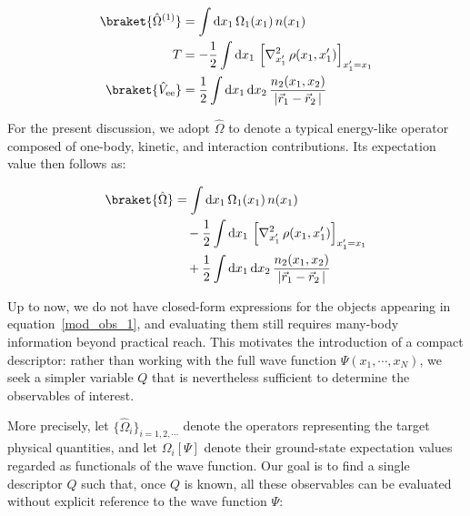 \begin{equation}
\begin{aligned}
    \braket{\hat{\Omega}^{(1)}} &= \int \mathrm{d}x_1\,\Omega_1(x_1)\,n(x_1)\\
    T &= -\frac{1}{2}\int \mathrm{d}x_1\,
    \left[\nabla_{x'_1}^{2}\,\rho(x_1,x'_1)\right]_{x'_1=x_1}\\
    \braket{\hat{V}_\mathrm{ee}} &= \frac{1}{2}\int \mathrm{d}x_1\,\mathrm{d}x_2\,
    \frac{n_2(x_1,x_2)}{|\vec{r}_1-\vec{r}_2\,|}
\end{aligned}
\label{one-body_operator_with_kernel}
\end{equation}

For the present discussion, we adopt $\hat{\Omega}$ to denote a typical energy-like operator composed of one-body, kinetic, and interaction contributions.
Its expectation value then follows as:

\begin{equation}
\begin{aligned}
    \braket{\hat{\Omega}} %
    &= \int \mathrm{d}x_1\, \Omega_1(x_1)\, n(x_1) \\
    &\quad - \frac{1}{2}\int \mathrm{d}x_1\,
    \left[\nabla_{x'_1}^{2}\,\rho(x_1,x'_1)\right]_{x'_1=x_1} \\
    &\quad + \frac{1}{2}\int \mathrm{d}x_1\,\mathrm{d}x_2\,
    \frac{n_2(x_1,x_2)}{|\vec{r}_1-\vec{r}_2\,|}
\end{aligned}
\label{mod_obs_1}
\end{equation}


Up to now, we do not have closed-form expressions for the objects appearing in equation~\eqref{mod_obs_1}, and evaluating them still requires many-body information beyond practical reach.
This motivates the introduction of a compact descriptor: rather than working with the full wave function $\Psi(x_1,\cdots,x_N)$, we seek a simpler variable $Q$ that is nevertheless sufficient to determine the observables of interest.

More precisely, let $\{\hat{\Omega}_i\}_{i=1,2,\cdots}$ denote the operators representing the target physical quantities, and let $\Omega_i[\Psi]$ denote their ground-state expectation values regarded as functionals of the wave function.
Our goal is to find a single descriptor $Q$ such that, once $Q$ is known, all these observables can be evaluated without explicit reference to the wave function $\Psi$:

